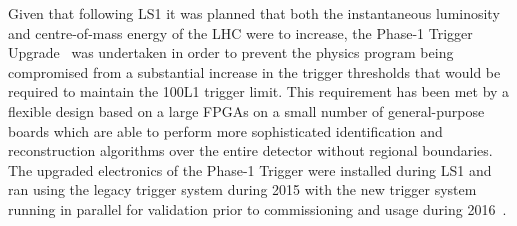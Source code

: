 Given that following LS1 it was planned that both the instantaneous luminosity and centre-of-mass energy of the LHC were to increase, the Phase-1 Trigger Upgrade~\cite{Tapper:2013yva} was undertaken in order to prevent the physics program being compromised from a substantial increase in the trigger thresholds that would be required to maintain the 100\kHz L1 trigger limit.	
This requirement has been met by a flexible design based on a large FPGAs on a small number of general-purpose boards which are able to perform more sophisticated identification and reconstruction algorithms over the entire detector without regional boundaries.
The upgraded electronics of the Phase-1 Trigger were installed during LS1 and ran using the legacy trigger system during 2015 with the new trigger system running in parallel for validation prior to commissioning and usage during 2016~\cite{Zabi:2017lya}.

